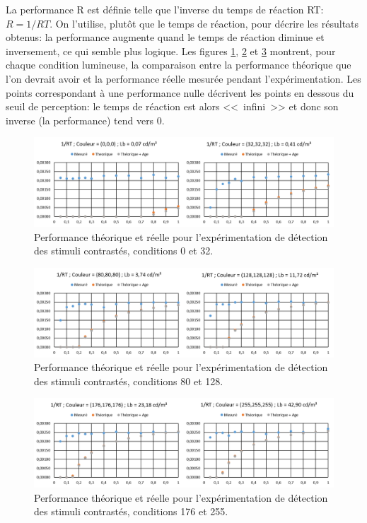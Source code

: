 	\par La performance R est définie telle que l'inverse du temps de réaction RT: $R = 1/RT$. On l'utilise, plutôt que le temps de réaction, pour décrire les résultats obtenus: la performance augmente quand le temps de réaction diminue et inversement, ce qui semble plus logique. Les figures \ref{fig:results_rvp_1}, \ref{fig:results_rvp_2} et \ref{fig:results_rvp_3} montrent, pour chaque condition lumineuse, la comparaison entre la performance théorique que l'on devrait avoir et la performance réelle mesurée pendant l'expérimentation. Les points correspondant à une performance nulle décrivent les points en dessous du seuil de perception: le temps de réaction est alors <<~infini~>> et donc son inverse (la performance) tend vers 0.
	
	\begin{figure}[h][h]
		\centering
		\includegraphics[width=\linewidth]{Figures/ResultsRVP_1}
		\caption{Performance théorique et réelle pour l'expérimentation de détection des stimuli contrastés, conditions 0 et 32.}
		\label{fig:results_rvp_1}
	\end{figure}
	
	\begin{figure}[h][h]
		\centering
		\includegraphics[width=\linewidth]{Figures/ResultsRVP_2}
		\caption{Performance théorique et réelle pour l'expérimentation de détection des stimuli contrastés, conditions 80 et 128.}
		\label{fig:results_rvp_2}
	\end{figure}
	
	\begin{figure}[h]
		\centering
		\includegraphics[width=\linewidth]{Figures/ResultsRVP_3}
		\caption{Performance théorique et réelle pour l'expérimentation de détection des stimuli contrastés, conditions 176 et 255.}
		\label{fig:results_rvp_3}
	\end{figure}
		
